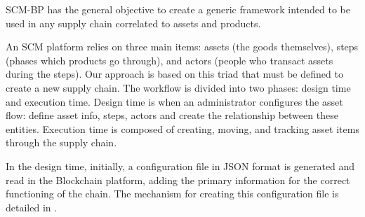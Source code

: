 \label{chap:Technical}

\acresetall 

\ac{SCM-BP} has the general objective to create a generic framework intended to be used in any supply chain correlated to assets and products. 

An SCM platform relies on three main items: assets (the goods themselves), steps (phases which products go through), and actors (people who transact assets during the steps). Our approach is based on this triad that must be defined to create a new supply chain. The workflow is divided into two phases: design time and execution time. Design time is when an administrator configures the asset flow: define asset info, steps, actors and create the relationship between these entities. Execution time is composed of creating, moving, and tracking asset items through the supply chain.

In the design time, initially, a configuration file in JSON format is generated and read in the Blockchain platform, adding the primary information for the correct functioning of the chain. The mechanism for creating this configuration file is detailed in .






%

%
%